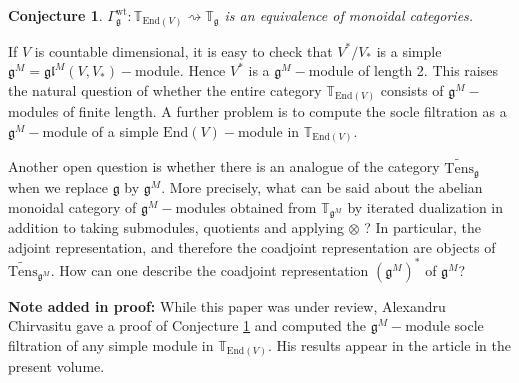 \documentclass{svmult}
\newtheorem{conject}[theo]{Conjecture}
\newcommand{\TT}{\mathbb{T}}
\newcommand{\wt}{\mathrm{wt}}
\renewcommand{\gg}{\mathfrak{g}}
\newcommand{\gl}{\mathfrak{gl}}
\newcommand{\End}{\mathrm{End}}
\begin{document}
\begin{conject}\label{conject:2}
 $\Gamma_{\gg}^\wt: \TT_{\End(V)} \rightsquigarrow \TT_{\gg}$ is an equivalence of monoidal categories.
\end{conject}

If $V$ is countable dimensional, it is easy to check that $V^*/V_*$ is a simple $\gg^M = \gl^M(V,V_*)-$module. Hence $V^*$ is a $\gg^M-$module of length 2. This raises the natural question of whether the entire category $\TT_{\End(V)}$ consists of $\gg^M-$modules of finite length. A further problem is to compute the socle filtration as a $\gg^M-$module of a simple $\End(V)-$module in $\TT_{\End(V)}$.

Another open question is whether there is an analogue of the category $\widetilde{\mathrm{Tens}}_{\gg}$ when we replace $\gg$ by $\gg^M$. More precisely, 
what can be said about the abelian monoidal category of $\gg^M-$modules obtained from $\TT_{\gg^M}$ by iterated dualization in addition to taking submodules, 
quotients and applying $\otimes$ ? In particular, the adjoint representation, and therefore the coadjoint representation are objects of 
$\widetilde{\mathrm{Tens}}_{\gg^M}$.  How can one describe the coadjoint representation $(\gg^M)^*$ of $\gg^M$?

\textbf{Note added in proof:} While this paper was under review, Alexandru Chirvasitu gave a proof of Conjecture \ref{conject:2} and computed the $\gg^M-$module socle filtration of any simple module in $\TT_{\End(V)}$. His results appear in the article \cite{C} in the present volume.
\end{document}
